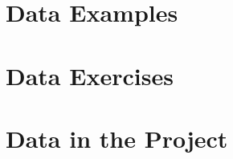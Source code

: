 



\clearpage
\section{Data Examples} %
\label{sec:data_examples}




\clearpage
\section{Data Exercises} %
\label{sec:data_exercises}


\clearpage
\section{Data in the Project} %
\label{sec:data_in_the_project}



